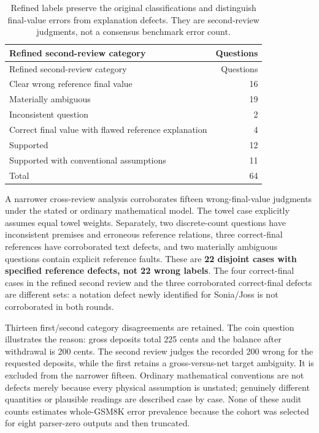 \documentclass[11pt,a4paper]{article}
\begin{document}
\begin{longtable}[]{@{}lr@{}}
\caption{Refined labels preserve the original classifications and
distinguish final-value errors from explanation defects. They are
second-review judgments, not a consensus benchmark error
count.}\tabularnewline
\toprule\noalign{}
Refined second-review category & Questions \\
\midrule\noalign{}
\endfirsthead
\toprule\noalign{}
Refined second-review category & Questions \\
\midrule\noalign{}
\endhead
\bottomrule\noalign{}
\endlastfoot
Clear wrong reference final value & 16 \\
Materially ambiguous & 19 \\
Inconsistent question & 2 \\
Correct final value with flawed reference explanation & 4 \\
Supported & 12 \\
Supported with conventional assumptions & 11 \\
Total & 64 \\
\end{longtable}

A narrower cross-review analysis corroborates fifteen wrong-final-value
judgments under the stated or ordinary mathematical model. The towel
case explicitly assumes equal towel weights. Separately, two
discrete-count questions have inconsistent premises and erroneous
reference relations, three correct-final references have corroborated
text defects, and two materially ambiguous questions contain explicit
reference faults. These are \textbf{22 disjoint cases with specified
reference defects, not 22 wrong labels}. The four correct-final cases in
the refined second review and the three corroborated correct-final
defects are different sets: a notation defect newly identified for
Sonia/Joss is not corroborated in both rounds.

Thirteen first/second category disagreements are retained. The coin
question illustrates the reason: gross deposits total 225 cents and the
balance after withdrawal is 200 cents. The second review judges the
recorded 200 wrong for the requested deposits, while the first retains a
gross-versus-net target ambiguity. It is excluded from the narrower
fifteen. Ordinary mathematical conventions are not defects merely
because every physical assumption is unstated; genuinely different
quantities or plausible readings are described case by case. None of
these audit counts estimates whole-GSM8K error prevalence because the
cohort was selected for eight parser-zero outputs and then truncated.
\end{document}
